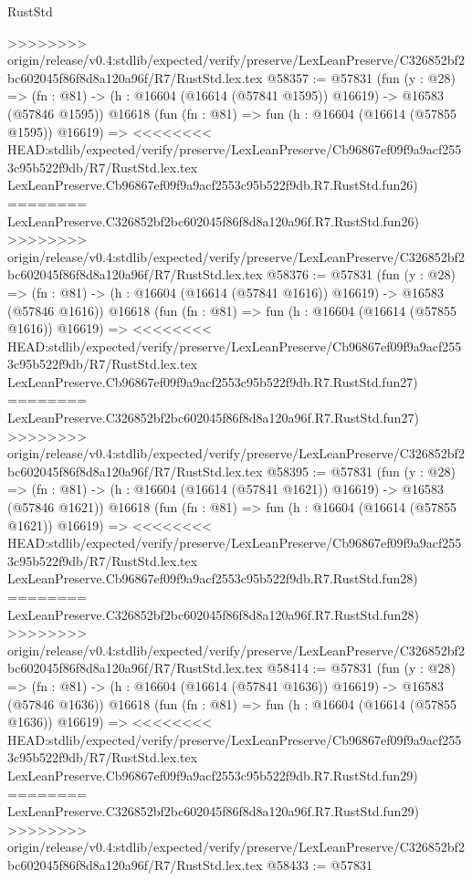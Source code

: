 \begin{lexlean}{RustStd}
\begin{coremodule}
{\begin{coremodule}
{{{{{{{{{{{{{{{{{{{{{{{{{{{{{{{{{{{{{{{{{{{{{{{{{{{{{{{>>>>>>>> origin/release/v0.4:stdlib/expected/verify/preserve/LexLeanPreserve/C326852bf2bc602045f86f8d8a120a96f/R7/RustStd.lex.tex
@58357 := @57831
    (fun (y : @28) =>
    (fn : @81) -> (h : @16604 (@16614 (@57841 @1595)) @16619) -> @16583 (@57846 @1595))
    @16618
    (fun (fn : @81) =>
    fun (h : @16604 (@16614 (@57855 @1595)) @16619) =>
<<<<<<<< HEAD:stdlib/expected/verify/preserve/LexLeanPreserve/Cb96867ef09f9a9acf2553c95b522f9db/R7/RustStd.lex.tex
    LexLeanPreserve.Cb96867ef09f9a9acf2553c95b522f9db.R7.RustStd.fun26)
========
    LexLeanPreserve.C326852bf2bc602045f86f8d8a120a96f.R7.RustStd.fun26)
>>>>>>>> origin/release/v0.4:stdlib/expected/verify/preserve/LexLeanPreserve/C326852bf2bc602045f86f8d8a120a96f/R7/RustStd.lex.tex
@58376 := @57831
    (fun (y : @28) =>
    (fn : @81) -> (h : @16604 (@16614 (@57841 @1616)) @16619) -> @16583 (@57846 @1616))
    @16618
    (fun (fn : @81) =>
    fun (h : @16604 (@16614 (@57855 @1616)) @16619) =>
<<<<<<<< HEAD:stdlib/expected/verify/preserve/LexLeanPreserve/Cb96867ef09f9a9acf2553c95b522f9db/R7/RustStd.lex.tex
    LexLeanPreserve.Cb96867ef09f9a9acf2553c95b522f9db.R7.RustStd.fun27)
========
    LexLeanPreserve.C326852bf2bc602045f86f8d8a120a96f.R7.RustStd.fun27)
>>>>>>>> origin/release/v0.4:stdlib/expected/verify/preserve/LexLeanPreserve/C326852bf2bc602045f86f8d8a120a96f/R7/RustStd.lex.tex
@58395 := @57831
    (fun (y : @28) =>
    (fn : @81) -> (h : @16604 (@16614 (@57841 @1621)) @16619) -> @16583 (@57846 @1621))
    @16618
    (fun (fn : @81) =>
    fun (h : @16604 (@16614 (@57855 @1621)) @16619) =>
<<<<<<<< HEAD:stdlib/expected/verify/preserve/LexLeanPreserve/Cb96867ef09f9a9acf2553c95b522f9db/R7/RustStd.lex.tex
    LexLeanPreserve.Cb96867ef09f9a9acf2553c95b522f9db.R7.RustStd.fun28)
========
    LexLeanPreserve.C326852bf2bc602045f86f8d8a120a96f.R7.RustStd.fun28)
>>>>>>>> origin/release/v0.4:stdlib/expected/verify/preserve/LexLeanPreserve/C326852bf2bc602045f86f8d8a120a96f/R7/RustStd.lex.tex
@58414 := @57831
    (fun (y : @28) =>
    (fn : @81) -> (h : @16604 (@16614 (@57841 @1636)) @16619) -> @16583 (@57846 @1636))
    @16618
    (fun (fn : @81) =>
    fun (h : @16604 (@16614 (@57855 @1636)) @16619) =>
<<<<<<<< HEAD:stdlib/expected/verify/preserve/LexLeanPreserve/Cb96867ef09f9a9acf2553c95b522f9db/R7/RustStd.lex.tex
    LexLeanPreserve.Cb96867ef09f9a9acf2553c95b522f9db.R7.RustStd.fun29)
========
    LexLeanPreserve.C326852bf2bc602045f86f8d8a120a96f.R7.RustStd.fun29)
>>>>>>>> origin/release/v0.4:stdlib/expected/verify/preserve/LexLeanPreserve/C326852bf2bc602045f86f8d8a120a96f/R7/RustStd.lex.tex
@58433 := @57831
}}}}}}}}}}}}}}}}}}}}}}}}}}}}}}}}}}}}}}}}}}}}}}}}}}}}}}}
\end{coremodule}}
\end{coremodule}
\end{lexlean}
